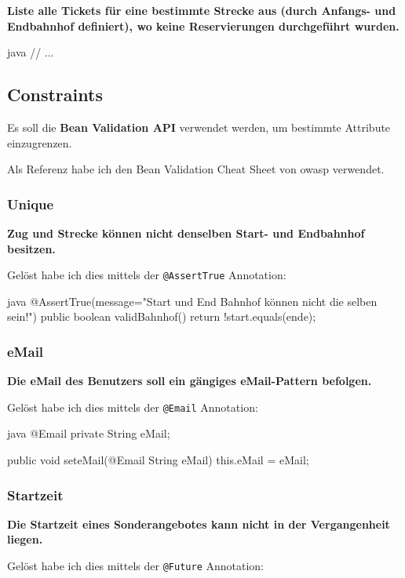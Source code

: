 \textbf{Liste alle Tickets für eine bestimmte Strecke aus (durch Anfangs- und Endbahnhof definiert), wo keine Reservierungen durchgeführt wurden.}

\begin{code}{java}
// ...
\end{code}

\clearpage
\subsection{Constraints}

Es soll die \textbf{Bean Validation API} verwendet werden, um bestimmte Attribute einzugrenzen.

Als Referenz habe ich den Bean Validation Cheat Sheet von owasp \cite{owasp:beanValidationCheatSheet} verwendet.

\subsubsection{Unique}
\textbf{Zug und Strecke können nicht denselben Start- und Endbahnhof besitzen.}

Gelöst habe ich dies mittels der \texttt{@AssertTrue} Annotation:

\begin{code}{java}
@AssertTrue(message="Start und End Bahnhof können nicht die selben sein!")
public boolean validBahnhof() {
    return !start.equals(ende);
}
\end{code}

\subsubsection{eMail}
\textbf{Die eMail des Benutzers soll ein gängiges eMail-Pattern befolgen.}

Gelöst habe ich dies mittels der \texttt{@Email} Annotation:

\begin{code}{java}
@Email
private String eMail;

public void seteMail(@Email String eMail) {
    this.eMail = eMail;
}
\end{code}

\subsubsection{Startzeit}
\textbf{Die Startzeit eines Sonderangebotes kann nicht in der Vergangenheit liegen.}

Gelöst habe ich dies mittels der \texttt{@Future} Annotation:

